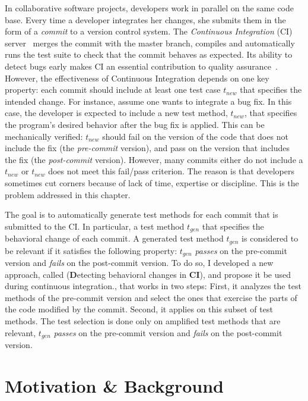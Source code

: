 \minitoc

In collaborative software projects, developers work in parallel on the same code base. 
Every time a developer integrates her changes, she submits them in the form of a \emph{commit} to a version control system.
The \emph{Continuous Integration} (CI) server~\cite{fowler2006continuous} merges the commit with the master branch, compiles and automatically runs the test suite to check that the commit behaves as expected.
Its ability to detect bugs early makes CI an essential contribution to quality assurance~\cite{Hilton:2016:UsageCI,duvall2007continuous}.
However, the effectiveness of Continuous Integration depends on one key property: 
each commit should include at least one test case $t_{new}$ that specifies the intended change.
For instance, assume one wants to integrate a bug fix.
In this case, the developer is expected to include a new test method, $t_{new}$, that specifies the program's desired behavior after the bug fix is applied.
This can be mechanically verified: $t_{new}$ should fail on the version of the code that does not include the fix (the \emph{pre-commit} version), and pass on the version that includes the fix (the \emph{post-commit} version).
However, many commits either do not include a $t_{new}$ or $t_{new}$ does not meet this fail/pass criterion.
The reason is that developers sometimes cut corners because of lack of time, expertise or discipline. 
This is the problem addressed in this chapter.

The goal is to automatically generate test methods for each commit that is submitted to the CI.
In particular, a test method $t_{gen}$ that specifies the behavioral change of each commit.
A generated test method $t_{gen}$ is considered to be relevant if it satisfies the following property: 
$t_{gen}$ \textit{passes} on the pre-commit version and \textit{fails} on the post-commit version.
To do so, I developed a new approach, called \DCI (\textbf{D}etecting behavioral changes in \textbf{CI}), and propose it be used during continuous integration., that works in two steps:
First, it analyzes the test methods of the pre-commit version and select the ones that exercise the parts of the code modified by the commit.
Second, it applies \dspot on this subset of test methods.
The test selection is done only on amplified test methods that are relevant, \ie $t_{gen}$ \textit{passes} on the pre-commit version and \textit{fails} on the post-commit version.

\section{Motivation \& Background}
\label{sec:dci:background}

